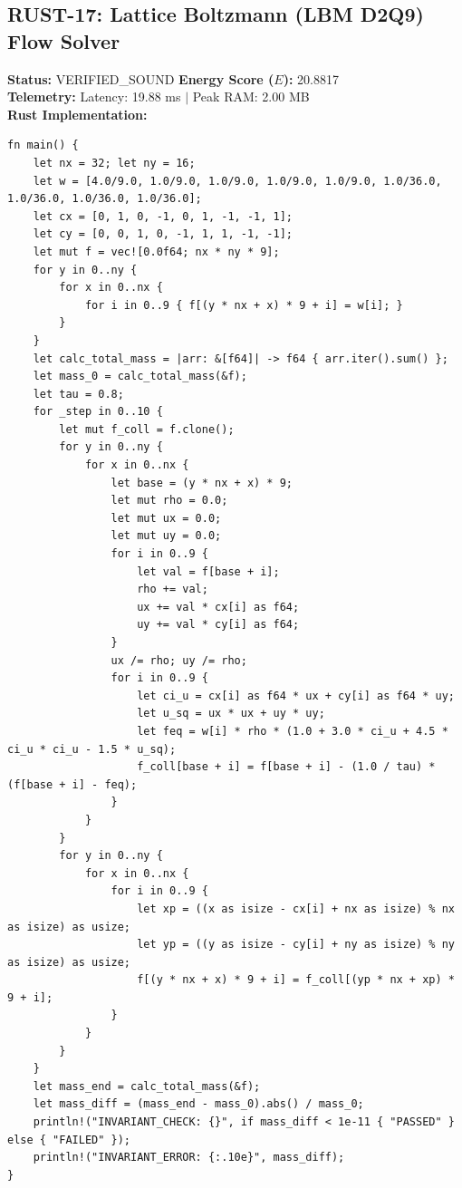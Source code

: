 \documentclass[11pt, a4paper]{article}
\begin{document}
\subsection{RUST-17: Lattice Boltzmann (LBM D2Q9) Flow Solver}
\textbf{Status:} VERIFIED\_SOUND \hfill \textbf{Energy Score ($E$):} 20.8817\\
\textbf{Telemetry:} Latency: 19.88 ms $|$ Peak RAM: 2.00 MB\\
\textbf{Rust Implementation:}
\begin{verbatim}
fn main() {
    let nx = 32; let ny = 16;
    let w = [4.0/9.0, 1.0/9.0, 1.0/9.0, 1.0/9.0, 1.0/9.0, 1.0/36.0, 1.0/36.0, 1.0/36.0, 1.0/36.0];
    let cx = [0, 1, 0, -1, 0, 1, -1, -1, 1];
    let cy = [0, 0, 1, 0, -1, 1, 1, -1, -1];
    let mut f = vec![0.0f64; nx * ny * 9];
    for y in 0..ny {
        for x in 0..nx {
            for i in 0..9 { f[(y * nx + x) * 9 + i] = w[i]; }
        }
    }
    let calc_total_mass = |arr: &[f64]| -> f64 { arr.iter().sum() };
    let mass_0 = calc_total_mass(&f);
    let tau = 0.8;
    for _step in 0..10 {
        let mut f_coll = f.clone();
        for y in 0..ny {
            for x in 0..nx {
                let base = (y * nx + x) * 9;
                let mut rho = 0.0;
                let mut ux = 0.0;
                let mut uy = 0.0;
                for i in 0..9 {
                    let val = f[base + i];
                    rho += val;
                    ux += val * cx[i] as f64;
                    uy += val * cy[i] as f64;
                }
                ux /= rho; uy /= rho;
                for i in 0..9 {
                    let ci_u = cx[i] as f64 * ux + cy[i] as f64 * uy;
                    let u_sq = ux * ux + uy * uy;
                    let feq = w[i] * rho * (1.0 + 3.0 * ci_u + 4.5 * ci_u * ci_u - 1.5 * u_sq);
                    f_coll[base + i] = f[base + i] - (1.0 / tau) * (f[base + i] - feq);
                }
            }
        }
        for y in 0..ny {
            for x in 0..nx {
                for i in 0..9 {
                    let xp = ((x as isize - cx[i] + nx as isize) % nx as isize) as usize;
                    let yp = ((y as isize - cy[i] + ny as isize) % ny as isize) as usize;
                    f[(y * nx + x) * 9 + i] = f_coll[(yp * nx + xp) * 9 + i];
                }
            }
        }
    }
    let mass_end = calc_total_mass(&f);
    let mass_diff = (mass_end - mass_0).abs() / mass_0;
    println!("INVARIANT_CHECK: {}", if mass_diff < 1e-11 { "PASSED" } else { "FAILED" });
    println!("INVARIANT_ERROR: {:.10e}", mass_diff);
}
\end{verbatim}
\end{document}
